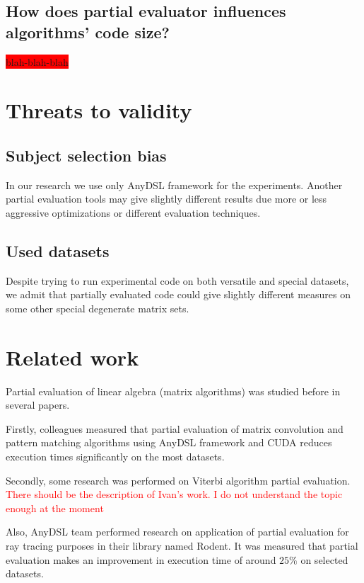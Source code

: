 \documentclass[conference]{IEEEtran}
\begin{document}
\subsection{How does partial evaluator influences algorithms' code size?}

\colorbox{red}{blah-blah-blah}

\section{Threats to validity}

\subsection{Subject selection bias}
In our research we use only AnyDSL framework for the experiments. Another partial evaluation tools may give slightly different results due more or less aggressive optimizations or different evaluation techniques.

\subsection{Used datasets}
Despite trying to run experimental code on both versatile and special datasets, we admit that partially evaluated code could give slightly different measures on some other special degenerate matrix sets.

\section{Related work}

Partial evaluation of linear algebra (matrix algorithms) was studied before in several papers.

Firstly, colleagues measured \cite{tyurin2020optimizing} that partial evaluation of matrix convolution and pattern matching algorithms using AnyDSL framework and CUDA reduces execution times significantly on the most datasets.

Secondly, some research was performed on Viterbi algorithm partial evaluation.  \textcolor{red}{There should be the description of Ivan's work. I do not understand the topic enough at the moment}

Also, AnyDSL team performed research \cite{perard2019rodent} on application of partial evaluation for ray tracing purposes in their library named Rodent. It was measured that partial evaluation  makes an improvement in execution time of around $25\%$ on selected datasets.




\end{document}
